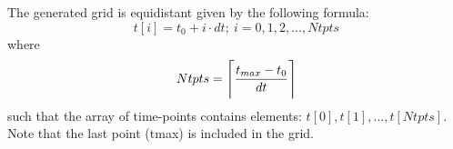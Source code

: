 \documentclass[a4paper,american,floatfix,pdftex,superscriptaddress,twoside,%
aps,pra,
linenumbers,%
reprint,%
]{revtex4-2}%
\DeclarePairedDelimiter{\ceil}{\lceil}{\rceil}
\begin{document}
The generated grid is equidistant given by the following formula:
\begin{equation}
t[i] = t_0 + i \cdot dt ;\ i=0,1,2,...,Ntpts
\end{equation}
where 
\begin{equation}
Ntpts = \ceil[\Bigg]{\frac{t_{max}-t_0}{dt}}
\end{equation}
such that the array of time-points contains elements: $t[0],t[1],...,t[Ntpts]$.
Note that the last point (tmax) is included in the grid. 



\end{document}
